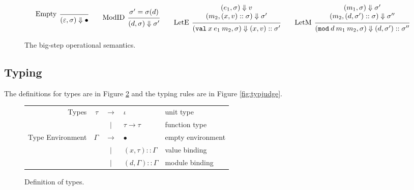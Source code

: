 \documentclass{article}
\theoremstyle{definition}
\newcommand*{\vbar}{|}
\newcommand*{\cons}{::}
\newcommand*{\modid}{d}
\newcommand*{\ctx}{\sigma}
\newcommand*{\semarrow}{\Downarrow}
\newcommand*{\Lete}{\mathtt{val}}
\newcommand*{\Letm}{\mathtt{mod}}
\begin{document}
\begin{figure}[h!]
  \[
    \begin{prooftree}
      \infer[left label=Empty]0{
      (\varepsilon, \ctx)
      \semarrow
      \bullet
      }
    \end{prooftree}\qquad
    \begin{prooftree}
      \hypo{\ctx'=\ctx(\modid)}
      \infer[left label=ModID]1{
      (\modid, \ctx)
      \semarrow
      \ctx'
      }
    \end{prooftree}\qquad
    \begin{prooftree}
      \hypo{
        \begin{matrix}
          (e_{1}, \ctx)
          \semarrow
          v \\
          (m_{2}, (x, v)\cons \ctx)
          \semarrow
          \ctx'
        \end{matrix}
      }
      \infer[left label=LetE]1{
      (\Lete\:x\:e_1\:m_2, \ctx)
      \semarrow
      (x,v)\cons\ctx'
      }
    \end{prooftree}\qquad
    \begin{prooftree}
      \hypo{
        \begin{matrix}
          (m_{1}, \ctx)
          \semarrow
          \ctx' \\
          (m_{2}, (\modid, \ctx')\cons \ctx)
          \semarrow
          \ctx''
        \end{matrix}
      }
      \infer[left label=LetM]1{
      (\Letm\:\modid\:m_{1}\:m_{2}, \ctx)
      \semarrow
      (\modid,\ctx')\cons\ctx''
      }
    \end{prooftree}
  \]
  \caption{The big-step operational semantics.}
  \label{fig:simpreach}
\end{figure}
\subsection{Typing}
The definitions for types are in Figure \ref{fig:typdom} and the typing rules are in Figure \ref{fig:typjudge}.

\begin{figure}[h!]
  \centering
  \begin{tabular}{rrcll}
    Types            & $\tau$   & $\rightarrow$ & $\iota$                       & unit type         \\
                     &          & $\vbar$       & $\tau\rightarrow\tau$         & function type     \\
    Type Environment & $\Gamma$ & $\rightarrow$ & $\bullet$                     & empty environment \\
                     &          & $\vbar$       & $(x,\tau)\cons \Gamma$        & value binding     \\
                     &          & $\vbar$       & $(\modid,\Gamma)\cons \Gamma$ & module binding
  \end{tabular}
  \caption{Definition of types.}
  \label{fig:typdom}
\end{figure}
\end{document}
